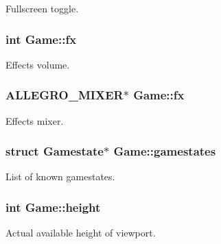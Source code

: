 Fullscreen toggle. \hypertarget{structGame_a10c0e81918f42e7367b4590e6885048e}{
\subsubsection[{fx}]{\setlength{\rightskip}{0pt plus 5cm}int Game\+::fx}}\label{structGame_a10c0e81918f42e7367b4590e6885048e}
Effects volume. \hypertarget{structGame_adb4702bfcc1973de315ead6d683331b2}{
\subsubsection[{fx}]{\setlength{\rightskip}{0pt plus 5cm}A\+L\+L\+E\+G\+R\+O\+\_\+\+M\+I\+X\+E\+R$\ast$ Game\+::fx}}\label{structGame_adb4702bfcc1973de315ead6d683331b2}
Effects mixer. \hypertarget{structGame_a985ae6ac3716fe725adbe9fc995ef23d}{
\subsubsection[{gamestates}]{\setlength{\rightskip}{0pt plus 5cm}struct {\bf Gamestate}$\ast$ Game\+::gamestates}}\label{structGame_a985ae6ac3716fe725adbe9fc995ef23d}
List of known gamestates. \hypertarget{structGame_aa6d1743c45de5558a0ca99078df85250}{
\subsubsection[{height}]{\setlength{\rightskip}{0pt plus 5cm}int Game\+::height}}\label{structGame_aa6d1743c45de5558a0ca99078df85250}
Actual available height of viewport.

